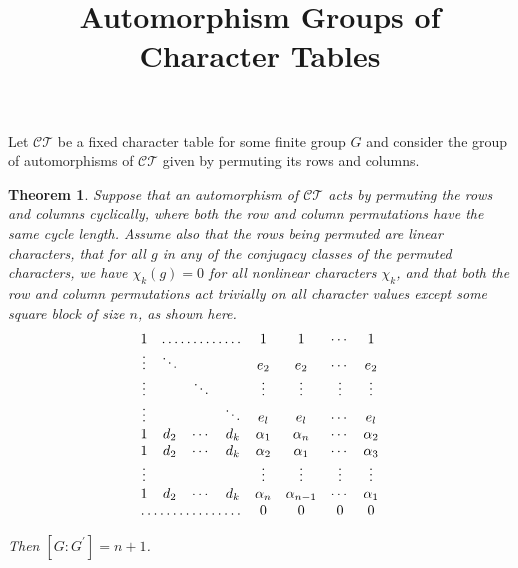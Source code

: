 \documentclass[12pt,letterpaper]{article}
\title{Automorphism Groups of Character Tables}
\newtheorem{thm}{Theorem}
\begin{document}
\maketitle
Let $\mathcal{CT}$ be a fixed character table for some finite group
$G$ and consider the group of automorphisms of $\mathcal{CT}$ given by
permuting its rows and columns.

\begin{thm}
  Suppose that an automorphism of $\mathcal{CT}$ acts by permuting the
  rows and columns cyclically, where both the row
  and column permutations have the same cycle length. Assume also that
  the rows being permuted are linear characters, that for all $g$ in
  any of the conjugacy classes of the permuted characters, we have
  $\chi_k(g)=0$ for all nonlinear characters $\chi_k$, and that both
  the row and column permutations act trivially on all character values except some
  square block of size $n$, as shown here. 
\[
\begin{matrix}
  1 & \hdotsfor{3}     & 1 & 1 & \cdots & 1\\
 \vdots   & \ddots & &              & e_2 & e_2 & \cdots & e_2\\
 \vdots   & & \ddots &              & \vdots & \vdots & \vdots & \vdots\\
 \vdots   & &  & \ddots             & e_{l} & e_{l} & \cdots & e_{l}\\
1 & d_2 & \cdots & d_{k} & \alpha_1    & \alpha_{n} & \cdots & \alpha_2\\
1 & d_2 & \cdots & d_{k} & \alpha_2    & \alpha_1    & \cdots & \alpha_3\\
\vdots    & & &              & \vdots     & \vdots      & \vdots & \vdots\\
1 & d_2 & \cdots & d_{k} & \alpha_{n} & \alpha_{n-1} & \cdots & \alpha_1\\
\hdotsfor{4}            & 0 & 0 & 0 & 0\\    
  
\end{matrix}
\]

Then $[G:G^{\prime}]=n+1$.
\end{thm}
\end{document}
